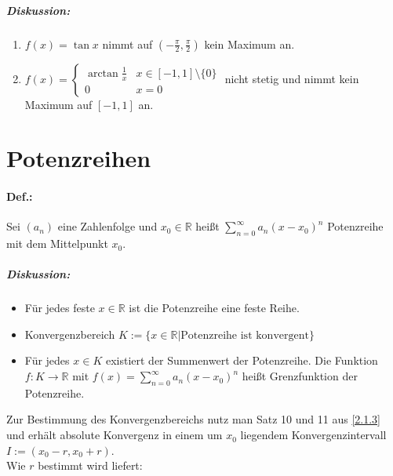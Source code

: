\subparagraph{Diskussion:}
\begin{enumerate}[label=\alph*.)]
\item $f(x) = \tan x$ nimmt auf $\left( - \frac{\pi}{2}, \frac{\pi}{2}\right)$ kein Maximum an.\\
\item $f(x) = \begin{cases}
\arctan \frac{1}{x} & x \in [-1,1]\setminus \{0\}\\
0 & x = 0
\end{cases}$ nicht stetig und nimmt kein Maximum auf $[-1,1]$ an.\\
\end{enumerate}

\section{Potenzreihen}
\paragraph{Def.:} Sei $(a_n)$ eine Zahlenfolge und $x_0 \in \mathbb{R}$ heißt $\boxed{\sum_{n=0}^\infty a_n (x-x_0)^n}$ Potenzreihe mit dem Mittelpunkt $x_0$.
\subparagraph{Diskussion:} 
\begin{itemize}
\item Für jedes feste $x \in \mathbb{R}$ ist die Potenzreihe eine feste Reihe.
\item Konvergenzbereich $K:=\{x\in \mathbb{R} | \text{Potenzreihe ist konvergent}\}$
\item Für jedes $x\in K$ existiert der Summenwert der Potenzreihe. Die Funktion $f: K \to \mathbb{R}$ mit $f(x) = \sum_{n=0}^\infty a_n (x-x_0)^n$ heißt Grenzfunktion der Potenzreihe.
\end{itemize}
Zur Bestimmung des Konvergenzbereichs nutz man Satz 10 und 11 aus \ref{2.1.3} und erhält absolute Konvergenz in einem um $x_0$ liegendem Konvergenzintervall $I:=(x_0-r, x_0+r)$.\\
Wie $r$ bestimmt wird liefert:

